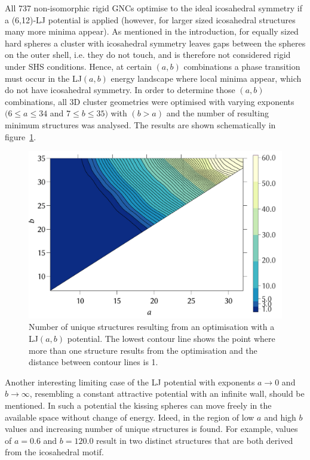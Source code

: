 All 737 non-isomorphic rigid GNCs optimise to the ideal icosahedral symmetry if
a (6,12)-LJ potential is applied
\autocite{Trombach_stickyhardsphereLennardJonestypeclusters_2018} (however, for
larger sized icosahedral structures many more minima
appear\autocite{Doye-1995,Wales_TheoreticalPredictionsStructure_1996,Doye_effectrangepotential_1996,Doye_Structuralconsequencesrange_1997}).
As mentioned in the introduction, for equally sized hard spheres a cluster with
icosahedral symmetry leaves gaps between the spheres on the outer shell, i.e.
they do not touch, and is therefore not considered rigid under SHS conditions.
Hence, at certain $(a,b)$ combinations a phase transition must occur in the
LJ$(a,b)$ energy landscape where local minima appear, which do not have
icosahedral symmetry. In order to determine those $(a,b)$ combinations, all 3D
cluster geometries were optimised with varying exponents $(6\leq a \leq 34$ and
$7\leq b\leq 35)$ with $(b>a)$ and the number of resulting minimum structures
was analysed. The results are shown schematically in figure~\ref{fig:ico-2d}.
%
\begin{figure}[htb]\centering
    \includegraphics[width=.8\columnwidth]{gregory-newton/ico-2d.pdf}
    \caption{Number of unique structures resulting from an optimisation with a
    LJ$(a,b)$ potential. The lowest contour line shows the point where more
    than one structure results from the optimisation and the distance between
    contour lines is 1.}
    \label{fig:ico-2d}
\end{figure}

Another interesting limiting case of the \ac{LJ} potential with exponents $a\to
0$ and $b\to \infty$, resembling a constant attractive potential with an
infinite wall, should be mentioned. In such a potential the kissing spheres can
move freely in the available space without change of energy. Ideed, in the
region of low $a$ and high $b$ values and increasing number of unique structures
is found. For example, values of $a=0.6$ and $b=120.0$ result in two distinct
structures that are both derived from the icosahedral motif.

